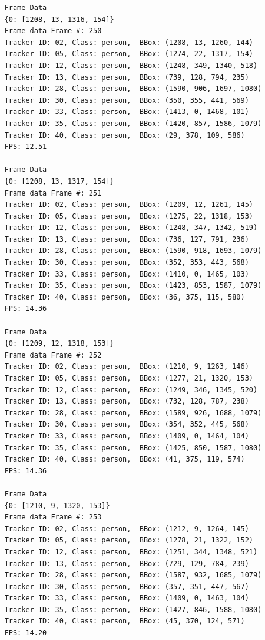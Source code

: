 \documentclass{fisatprojectfinal}
\begin{document}
\begin{verbatim}
    Frame Data
    {0: [1208, 13, 1316, 154]}
    Frame data Frame #: 250
    Tracker ID: 02, Class: person,  BBox: (1208, 13, 1260, 144)
    Tracker ID: 05, Class: person,  BBox: (1274, 22, 1317, 154)
    Tracker ID: 12, Class: person,  BBox: (1248, 349, 1340, 518)
    Tracker ID: 13, Class: person,  BBox: (739, 128, 794, 235)
    Tracker ID: 28, Class: person,  BBox: (1590, 906, 1697, 1080)
    Tracker ID: 30, Class: person,  BBox: (350, 355, 441, 569)
    Tracker ID: 33, Class: person,  BBox: (1413, 0, 1468, 101)
    Tracker ID: 35, Class: person,  BBox: (1420, 857, 1586, 1079)
    Tracker ID: 40, Class: person,  BBox: (29, 378, 109, 586)
    FPS: 12.51
    
    Frame Data
    {0: [1208, 13, 1317, 154]}
    Frame data Frame #: 251
    Tracker ID: 02, Class: person,  BBox: (1209, 12, 1261, 145)
    Tracker ID: 05, Class: person,  BBox: (1275, 22, 1318, 153)
    Tracker ID: 12, Class: person,  BBox: (1248, 347, 1342, 519)
    Tracker ID: 13, Class: person,  BBox: (736, 127, 791, 236)
    Tracker ID: 28, Class: person,  BBox: (1590, 918, 1693, 1079)
    Tracker ID: 30, Class: person,  BBox: (352, 353, 443, 568)
    Tracker ID: 33, Class: person,  BBox: (1410, 0, 1465, 103)
    Tracker ID: 35, Class: person,  BBox: (1423, 853, 1587, 1079)
    Tracker ID: 40, Class: person,  BBox: (36, 375, 115, 580)
    FPS: 14.36
    
    Frame Data
    {0: [1209, 12, 1318, 153]}
    Frame data Frame #: 252
    Tracker ID: 02, Class: person,  BBox: (1210, 9, 1263, 146)
    Tracker ID: 05, Class: person,  BBox: (1277, 21, 1320, 153)
    Tracker ID: 12, Class: person,  BBox: (1249, 346, 1345, 520)
    Tracker ID: 13, Class: person,  BBox: (732, 128, 787, 238)
    Tracker ID: 28, Class: person,  BBox: (1589, 926, 1688, 1079)
    Tracker ID: 30, Class: person,  BBox: (354, 352, 445, 568)
    Tracker ID: 33, Class: person,  BBox: (1409, 0, 1464, 104)
    Tracker ID: 35, Class: person,  BBox: (1425, 850, 1587, 1080)
    Tracker ID: 40, Class: person,  BBox: (41, 375, 119, 574)
    FPS: 14.36
    
    Frame Data
    {0: [1210, 9, 1320, 153]}
    Frame data Frame #: 253
    Tracker ID: 02, Class: person,  BBox: (1212, 9, 1264, 145)
    Tracker ID: 05, Class: person,  BBox: (1278, 21, 1322, 152)
    Tracker ID: 12, Class: person,  BBox: (1251, 344, 1348, 521)
    Tracker ID: 13, Class: person,  BBox: (729, 129, 784, 239)
    Tracker ID: 28, Class: person,  BBox: (1587, 932, 1685, 1079)
    Tracker ID: 30, Class: person,  BBox: (357, 351, 447, 567)
    Tracker ID: 33, Class: person,  BBox: (1409, 0, 1463, 104)
    Tracker ID: 35, Class: person,  BBox: (1427, 846, 1588, 1080)
    Tracker ID: 40, Class: person,  BBox: (45, 370, 124, 571)
    FPS: 14.20
    

\end{verbatim}
\end{document}
